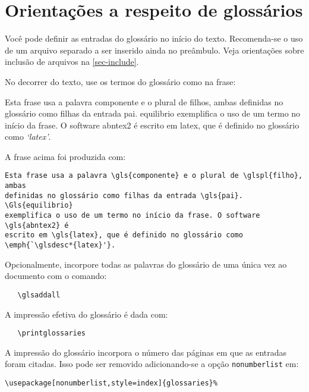 \section{Orientações a respeito de glossários}

Você pode definir as entradas do glossário no início do texto. Recomenda-se o
uso de um arquivo separado a ser inserido ainda no preâmbulo. Veja orientações
sobre inclusão de arquivos na \autoref{sec-include}.

No decorrer do texto, use os termos do glossário como na frase:

\begin{citacao}
Esta frase usa a palavra \gls{componente} e o plural de \glspl{filho}, ambas
definidas no glossário como filhas da entrada \gls{pai}. \Gls{equilibrio}
exemplifica o uso de um termo no início da frase. O software \gls{abntex2} é
escrito em \gls{latex}, que é definido no glossário como
\emph{`\glsdesc*{latex}'}.
\end{citacao}


A frase acima foi produzida com:

\begin{verbatim}
Esta frase usa a palavra \gls{componente} e o plural de \glspl{filho}, ambas
definidas no glossário como filhas da entrada \gls{pai}. \Gls{equilibrio}
exemplifica o uso de um termo no início da frase. O software \gls{abntex2} é
escrito em \gls{latex}, que é definido no glossário como
\emph{`\glsdesc*{latex}'}.
\end{verbatim}

Opcionalmente, incorpore todas as palavras do glossário de uma única vez ao
documento com o comando:

\begin{verbatim}
   \glsaddall
\end{verbatim}

A impressão efetiva do glossário é dada com:

\begin{verbatim}
   \printglossaries
\end{verbatim}

A impressão do glossário incorpora o número das páginas em que as entradas foram
citadas. Isso pode ser removido adicionando-se a opção \texttt{nonumberlist} em:

\begin{verbatim}
\usepackage[nonumberlist,style=index]{glossaries}%
\end{verbatim}

